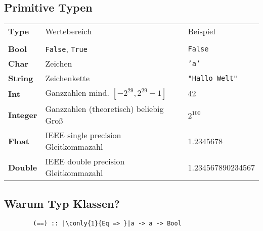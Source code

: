 \documentclass[
	aspectratio=169, 
	10pt 
]{beamer}
\newcommand\conly[2]{\only<#1>{#2}}
\begin{document}
\subsection{Primitive Typen}
\begin{frame}{\insertsubsection}
	\renewcommand{\arraystretch}{1.2}
	\begin{tabular}{>{\bfseries\color{red}}lll}
		Type & Wertebereich & Beispiel\\\\
		Bool & \texttt{False}, \texttt{True} & \texttt{False} \\
		Char & Zeichen & \texttt{'a'} \\
		String & Zeichenkette & \texttt{"Hallo Welt"} \\
		Int & Ganzzahlen mind. $[-2^{29}, 2^{29}-1]$ & $42$ \\
		Integer & Ganzzahlen (theoretisch) beliebig Groß & $2^{100}$ \\
		Float & IEEE single precision Gleitkommazahl  & 1.2345678 \\
		Double & IEEE double precision Gleitkommazahl & 1.234567890234567\\
	\end{tabular}
\end{frame}


\subsection{Warum Typ Klassen?}
\begin{frame}[fragile]{\insertsubsection}
	\begin{verbatim}
		(==) :: |\conly{1}{Eq => }|a -> a -> Bool
	\end{verbatim}

\end{frame}

\end{document}
